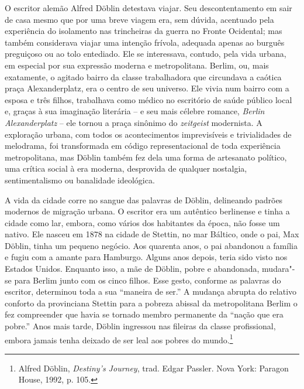 \asterisc

O escritor alemão Alfred Döblin detestava viajar. Seu descontentamento
em sair de casa mesmo que por uma breve viagem era, sem dúvida,
acentuado pela experiência do isolamento nas trincheiras da guerra no
Fronte Ocidental; mas também considerava viajar uma intenção frívola,
adequada apenas ao burguês preguiçoso ou ao tolo entediado. Ele se
interessava, contudo, pela vida urbana, em especial por sua expressão
moderna e metropolitana. Berlim, ou, mais exatamente, o agitado bairro
da classe trabalhadora que circundava a caótica praça Alexanderplatz,
era o centro de seu universo. Ele vivia num bairro com a esposa e três
filhos, trabalhava como médico no escritório de saúde público local e,
graças à sua imaginação literária -- e seu mais célebre romance,
\textit{Berlin Alexanderplatz} -- ele tornou a praça sinônimo do
\textit{zeitgeist} modernista. A exploração urbana, com todos os
acontecimentos imprevisíveis e trivialidades de melodrama, foi
transformada em código representacional de toda experiência
metropolitana, mas Döblin também fez dela uma forma de artesanato
político, uma crítica social à era moderna, desprovida de qualquer
nostalgia, sentimentalismo ou banalidade ideológica.

A vida da cidade corre no sangue das palavras de Döblin, delineando
padrões modernos de migração urbana. O escritor era um autêntico
berlinense e tinha a cidade como lar, embora, como vários dos habitantes
da época, não fosse um nativo. Ele nasceu em 1878 na cidade de Stettin,
no mar Báltico, onde o pai, Max Döblin, tinha um pequeno negócio. Aos
quarenta anos, o pai abandonou a família e fugiu com a amante para
Hamburgo. Alguns anos depois, teria sido visto nos Estados Unidos.
Enquanto isso, a mãe de Döblin, pobre e abandonada, mudara"-se para
Berlim junto com os cinco filhos. Esse gesto, conforme as palavras do
escritor, determinou toda a sua ``maneira de ser.'' A mudança abrupta do
relativo conforto da provinciana Stettin para a pobreza abissal da
metropolitana Berlim o fez compreender que havia se tornado membro
permanente da ``nação que era pobre.'' Anos mais tarde, Döblin ingressou
nas fileiras da classe profissional, embora jamais tenha deixado de ser
leal aos pobres do mundo.\footnote{Alfred Döblin, \textit{Destiny's Journey}, trad. Edgar Passler. Nova York: Paragon House, 1992, p. 105.}


